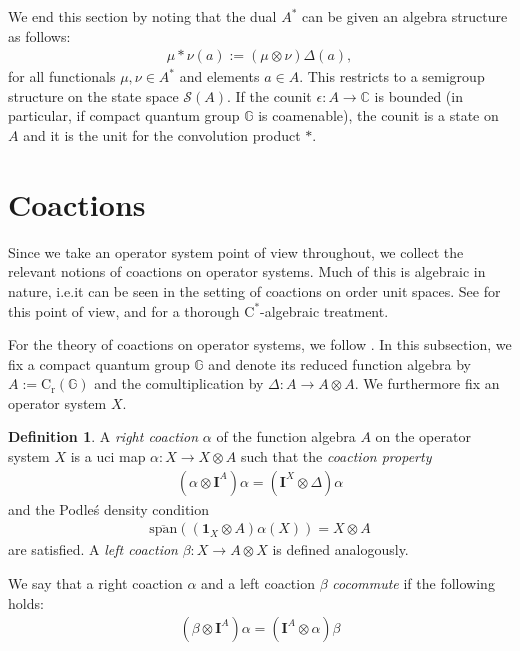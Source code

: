 \documentclass{amsart}
\theoremstyle{plain}
\theoremstyle{definition}
\newtheorem{definition}[theorem]{Definition}
\theoremstyle{remark}
\begin{document}
	We end this section by noting that the dual $A^*$ can be given an algebra structure as follows:
	\begin{align}
		\mu \ast \nu (a) := (\mu \otimes \nu) \Delta(a),
	\end{align}
	for all functionals $\mu, \nu \in A^*$ and elements $a \in A$.
	This restricts to a semigroup structure on the state space $\mathcal{S}(A)$.
	If the counit $\epsilon : A \rightarrow \mathbb{C}$ is bounded (in particular, if compact quantum group $\mathbb{G}$ is coamenable), the counit is a state on $A$ and it is the unit for the convolution product $*$.
	
	
	
	\section{Coactions}\label{sec:Coactions}	
	
	Since we take an operator system point of view throughout, we collect the relevant notions of coactions on operator systems.
	Much of this is algebraic in nature, i.e.\@ it can be seen in the setting of coactions on order unit spaces.
	See \cite{Sai09} for this point of view, and \cite{DC16} for a thorough $\mathrm{C}^*$-algebraic treatment.
	
	For the theory of coactions on operator systems, we follow \cite{dRH24,dR23}.
	In this subsection, we fix a compact quantum group $\mathbb{G}$ and denote its reduced function algebra by $A := \mathrm{C}_\mathrm{r}(\mathbb{G})$ and the comultiplication by $\Delta : A \rightarrow A \otimes A$.
	We furthermore fix an operator system $X$.
	
	\begin{definition}\label{def:Action-on-Operator-System}
		A \emph{right coaction} $\alpha$ of the function algebra $A$ on the operator system $X$ is a uci map $\alpha : X \rightarrow X \otimes A$ such that the \emph{coaction property} 
		\begin{align}\label{eqn:Coaction-property}
			(\alpha \otimes \mathbf{I}^A) \alpha 
			= (\mathbf{I}^X \otimes \Delta) \alpha
		\end{align} 
		and the Podleś density condition 
		\begin{align}\label{eqn:Podles-density-property}
			\overline{\mathrm{span}}((\mathbf{1}_X \otimes A)\alpha(X)) = X \otimes A
		\end{align} 
		are satisfied.
		A \emph{left coaction} $\beta : X \rightarrow A \otimes X$ is defined analogously.
		
		We say that a right coaction $\alpha$ and a left coaction $\beta$ \emph{cocommute} if the following holds:
		\begin{align}\label{eqn:Cocommuting-coactions}
			(\beta \otimes \mathbf{I}^A) \alpha = (\mathbf{I}^A \otimes \alpha) \beta
		\end{align}
	\end{definition}
	
\end{document}
